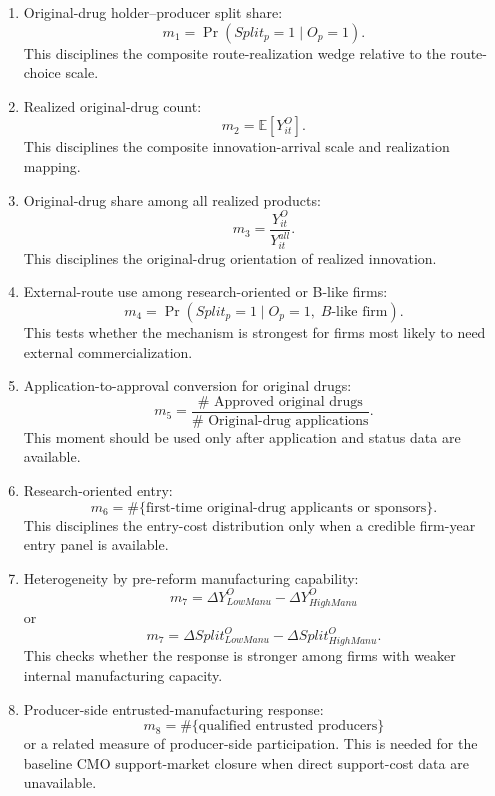 \documentclass[12pt]{article}
\newcommand{\E}{\mathbb{E}}
\newcommand{\1}{\mathbf{1}}
\begin{document}
\begin{enumerate}
    \item Original-drug holder--producer split share:
    \[
        m_1=\Pr(Split_p=1\mid O_p=1).
    \]
    This disciplines the composite route-realization wedge relative to the route-choice scale.

    \item Realized original-drug count:
    \[
        m_2=\E[Y^O_{it}].
    \]
    This disciplines the composite innovation-arrival scale and realization mapping.

    \item Original-drug share among all realized products:
    \[
        m_3=\frac{Y^O_{it}}{Y^{all}_{it}}.
    \]
    This disciplines the original-drug orientation of realized innovation.

    \item External-route use among research-oriented or B-like firms:
    \[
        m_4=\Pr(Split_p=1\mid O_p=1,\;B\text{-like firm}).
    \]
    This tests whether the mechanism is strongest for firms most likely to need external commercialization.

    \item Application-to-approval conversion for original drugs:
    \[
        m_5=\frac{\#\text{ Approved original drugs}}{\#\text{ Original-drug applications}}.
    \]
    This moment should be used only after application and status data are available.

    \item Research-oriented entry:
    \[
        m_6=\#\{\text{first-time original-drug applicants or sponsors}\}.
    \]
    This disciplines the entry-cost distribution only when a credible firm-year entry panel is available.

    \item Heterogeneity by pre-reform manufacturing capability:
    \[
        m_7=\Delta Y^O_{LowManu}-\Delta Y^O_{HighManu}
    \]
    or
    \[
        m_7=\Delta Split^O_{LowManu}-\Delta Split^O_{HighManu}.
    \]
    This checks whether the response is stronger among firms with weaker internal manufacturing capacity.

    \item Producer-side entrusted-manufacturing response:
    \[
        m_8=\#\{\text{qualified entrusted producers}\}
    \]
    or a related measure of producer-side participation. This is needed for the baseline CMO support-market closure when direct support-cost data are unavailable.
\end{enumerate}
\end{document}
